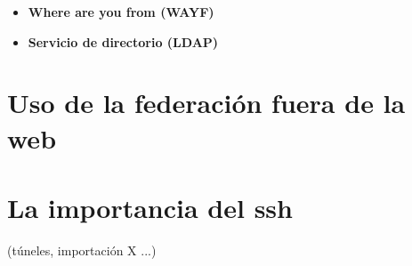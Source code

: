 \begin{itemize}
    Un SP está estrechamente relacionado con un servidor web, y se
    comunica con los diferentes IdPs de la federación. Esta es la
    forma que tiene el sistema de pasar los datos de identidad de una
    organización a otra, de forma segura, a través del protocolo SAML.

    Cada aplicación web federada debería estar protegida por un SP,
    así pues puede haber más de un SP por cada organización.

    Dada la estrecha relación entre el IdP y el SP, el software
    necesario para dar este servicio se puede encontrar en las mismas
    páginas. Tanto Shibboleth, como simplesamlphp ofrecen tanto el
    servicio de IdP, como el de SP:

    \begin{itemize}
        \item \textbf{Shibboleth IdP} \href{http://shibboleth.internet2.edu/}http://shibboleth.internet2.edu/
        \item \textbf{SimpleSAMLPHP} \href{http://code.google.com/p/simplesamlphp/}http://code.google.com/p/simplesamlphp/
    \end{itemize}



    En teoría es independiente el software que se utilice como IdP, o
    como SP por las diferentes organizaciones, ya que todos deberían
    compartir el mismo protocolo, SAML.

            \item \textbf{Where are you from (WAYF)}

            \item \textbf{Servicio de directorio (LDAP)}


            \end{itemize}


    \section{Uso de la federación fuera de la web}

    \section{La importancia del ssh}
         (túneles, importación X ...)
